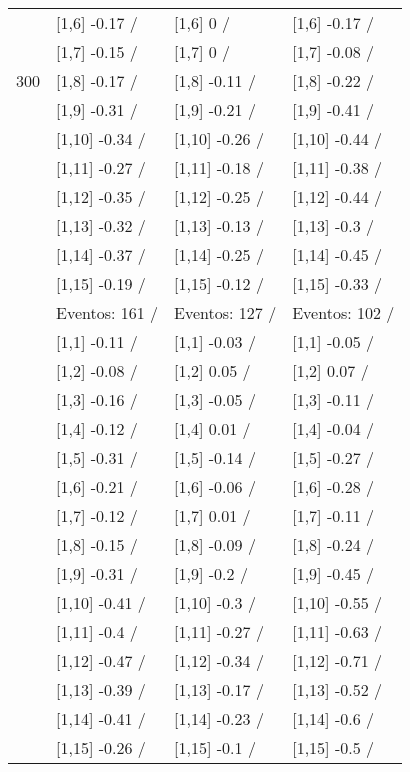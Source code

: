 \begin{table}
\begin{tabular}[t]{llll}
 & {}[1,6] -0.17  / & {}[1,6] 0  / & {}[1,6] -0.17  /\\
 & {}[1,7] -0.15  / & {}[1,7] 0  / & {}[1,7] -0.08  /\\
300 & {}[1,8] -0.17  / & {}[1,8] -0.11  / & {}[1,8] -0.22  /\\
\addlinespace
 & {}[1,9] -0.31  / & {}[1,9] -0.21  / & {}[1,9] -0.41  /\\
 & {}[1,10] -0.34  / & {}[1,10] -0.26  / & {}[1,10] -0.44  /\\
 & {}[1,11] -0.27  / & {}[1,11] -0.18  / & {}[1,11] -0.38  /\\
 & {}[1,12] -0.35  / & {}[1,12] -0.25  / & {}[1,12] -0.44  /\\
 & {}[1,13] -0.32  / & {}[1,13] -0.13  / & {}[1,13] -0.3  /\\
\addlinespace
 & {}[1,14] -0.37  / & {}[1,14] -0.25  / & {}[1,14] -0.45  /\\
 & {}[1,15] -0.19  / & {}[1,15] -0.12  / & {}[1,15] -0.33  /\\
 & Eventos:  161 / & Eventos:  127 / & Eventos:  102 /\\
 & {}[1,1] -0.11  / & {}[1,1] -0.03  / & {}[1,1] -0.05  /\\
 & {}[1,2] -0.08  / & {}[1,2] 0.05  / & {}[1,2] 0.07  /\\
\addlinespace
 & {}[1,3] -0.16  / & {}[1,3] -0.05  / & {}[1,3] -0.11  /\\
 & {}[1,4] -0.12  / & {}[1,4] 0.01  / & {}[1,4] -0.04  /\\
 & {}[1,5] -0.31  / & {}[1,5] -0.14  / & {}[1,5] -0.27  /\\
 & {}[1,6] -0.21  / & {}[1,6] -0.06  / & {}[1,6] -0.28  /\\
 & {}[1,7] -0.12  / & {}[1,7] 0.01  / & {}[1,7] -0.11  /\\
\addlinespace
500 & {}[1,8] -0.15  / & {}[1,8] -0.09  / & {}[1,8] -0.24  /\\
 & {}[1,9] -0.31  / & {}[1,9] -0.2  / & {}[1,9] -0.45  /\\
 & {}[1,10] -0.41  / & {}[1,10] -0.3  / & {}[1,10] -0.55  /\\
 & {}[1,11] -0.4  / & {}[1,11] -0.27  / & {}[1,11] -0.63  /\\
 & {}[1,12] -0.47  / & {}[1,12] -0.34  / & {}[1,12] -0.71  /\\
\addlinespace
 & {}[1,13] -0.39  / & {}[1,13] -0.17  / & {}[1,13] -0.52  /\\
 & {}[1,14] -0.41  / & {}[1,14] -0.23  / & {}[1,14] -0.6  /\\
 & {}[1,15] -0.26  / & {}[1,15] -0.1  / & {}[1,15] -0.5  /\\
\bottomrule
\end{tabular}
\end{table}
